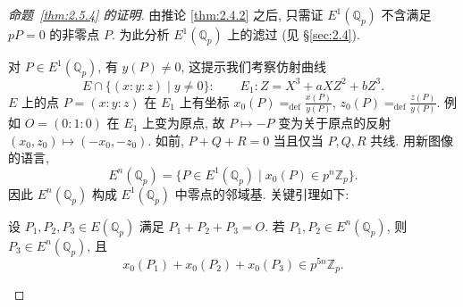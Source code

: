 \begin{proof}[命题~\ref{thm:2.5.4} 的证明]
由推论 \ref{thm:2.4.2} 之后, 只需证 $E^1(\mathbb{Q}_p)$ 不含满足 $pP = 0$ 的非零点 $P$. 为此分析 $E^1(\mathbb{Q}_p)$ 上的滤过 (见 \S\ref{sec:2.4}).

对 $P\in E^1(\mathbb{Q}_p)$, 有 $y(P)\neq 0$, 这提示我们考察仿射曲线
\begin{equation} \label{eq:17}
E\cap\{(x:y:z) \mid y\neq 0\}: \qquad
E_1\colon Z = X^3 + aXZ^2 + bZ^3.
\tag{17}
\end{equation}
$E$ 上的点 $P = (x:y:z)$ 在 $E_1$ 上有坐标 $x_0(P) \mathrel{=_{\mathrm{def}}} \frac{x(P)}{y(P)}$, $z_0(P) \mathrel{=_{\mathrm{def}}} \frac{z(P)}{y(P)}$. 例如 $O = (0:1:0)$ 在 $E_1$ 上变为原点, 故 $P\mapsto-P$ 变为关于原点的反射 $(x_0, z_0)\mapsto(-x_0, -z_0)$. 如前, $P + Q + R = 0$ 当且仅当 $P, Q, R$ 共线. 用新图像的语言,
\[
E^n(\mathbb{Q}_p) = \{P\in E^1(\mathbb{Q}_p) \mid x_0(P)\in p^n\mathbb{Z}_p\}.
\]
因此 $E^n(\mathbb{Q}_p)$ 构成 $E^1(\mathbb{Q}_p)$ 中零点的邻域基. 关键引理如下:

\begin{lemma} \label{thm:2.5.9} 
设 $P_1, P_2, P_3\in E(\mathbb{Q}_p)$ 满足 $P_1 + P_2 + P_3 = O$. 若 $P_1, P_2\in E^n(\mathbb{Q}_p)$, 则 $P_3\in E^n(\mathbb{Q}_p)$, 且
\[
x_0(P_1) + x_0(P_2) + x_0(P_3)\in p^{5n}\mathbb{Z}_p.
\]
\end{lemma}


\end{proof}
